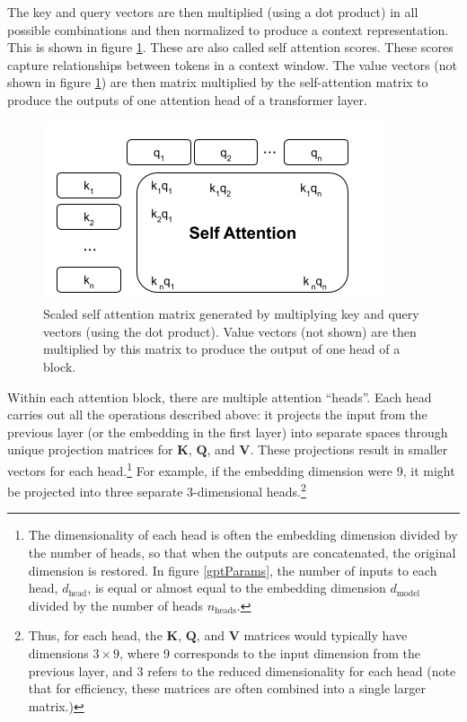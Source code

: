 The key and query vectors are then multiplied (using a dot product) in all possible combinations and then normalized to produce a context representation. This is shown in figure \ref{selfAttention}. These are also called self attention scores. These scores capture relationships between tokens in a context window. The value vectors (not shown in figure \ref{selfAttention}) are then matrix multiplied by the self-attention matrix to produce the outputs of one attention head of a transformer layer.

\begin{figure}[h]
\centering
\includegraphics[scale=.6]{./images/selfAttention.png}
\caption[Jeff Yoshimi with consultation from Tim Meyer.]{Scaled self attention matrix generated by multiplying key and query vectors (using the dot product). Value vectors (not shown) are then multiplied by this matrix to produce the output of one head of a block.}
\label{selfAttention}
\end{figure}

Within each attention block, there are multiple attention ``heads''. Each head carries out all the operations described above: it projects the input from the previous layer (or the embedding in the first layer) into separate spaces through unique projection matrices for $\textbf{K}$, $\textbf{Q}$, and $\textbf{V}$. These projections result in smaller vectors for each head.\footnote{The dimensionality of each head is often the embedding dimension divided by the number of heads, so that when the outputs are concatenated, the original dimension is restored. In figure \ref{gptParams}, the number of inputs to each head, $d_\text{head}$, is equal or almost equal to the embedding dimension $d_\text{model}$ divided by the number of heads $n_\text{heads}$.} For example, if the embedding dimension were 9, it might be projected into three separate 3-dimensional heads.\footnote{Thus, for each head, the $\textbf{K}$, $\textbf{Q}$, and $\textbf{V}$ matrices would typically have dimensions $3 \times 9$, where 9 corresponds to the input dimension from the previous layer, and 3 refers to the reduced dimensionality for each head (note that for efficiency, these matrices are often combined into a single larger matrix.)}

